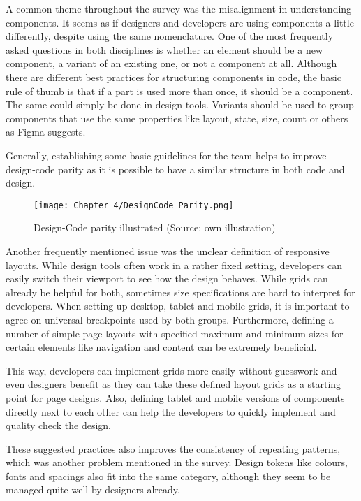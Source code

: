 A common theme throughout the survey was the misalignment in understanding components. It seems as
if designers and developers are using components a little differently, despite using the same
nomenclature. One of the most frequently asked questions in both disciplines is whether an element
should be a new component, a variant of an existing one, or not a component at all. Although there
are different best practices for structuring components in code, the basic rule of thumb is that if
a part is used more than once, it should be a component. The same could simply be done in design
tools. Variants should be used to group components that use the same properties like layout, state,
size, count or others as Figma suggests. 

Generally, establishing some basic guidelines for the team helps to improve design-code parity as it
is possible to have a similar structure in both code and design.
\begin{figure}[H]
    \centering
    \texttt{[image: Chapter 4/DesignCode Parity.png]}
    \caption{Design-Code parity illustrated (Source: own illustration)}
\end{figure}

Another frequently mentioned issue was the unclear definition of responsive layouts. While design
tools often work in a rather fixed setting, developers can easily switch their viewport to see how
the design behaves. While grids can already be helpful for both, sometimes size specifications are
hard to interpret for developers. When setting up desktop, tablet and mobile grids, it is important
to agree on universal breakpoints used by both groups. Furthermore, defining a number of simple page
layouts with specified maximum and minimum sizes for certain elements like navigation and content
can be extremely beneficial.

This way, developers can implement grids more easily without guesswork and even designers benefit as
they can take these defined layout grids as a starting point for page designs. Also, defining tablet
and mobile versions of components directly next to each other can help the developers to quickly
implement and quality check the design.

These suggested practices also improves the consistency of repeating patterns, which was another
problem mentioned in the survey. Design tokens like colours, fonts and spacings also fit into the
same category, although they seem to be managed quite well by designers already.

